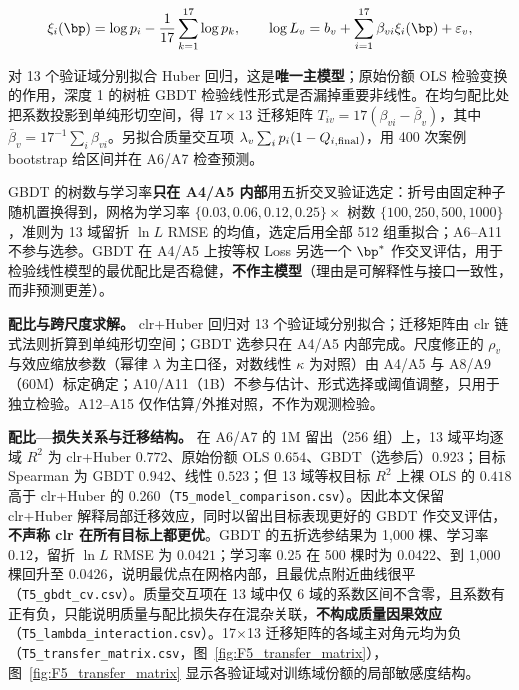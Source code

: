 \begin{equation*}
\xi_i(\bp)=\log p_i-\frac1{17}\sum_{k=1}^{17}\log p_k,\qquad
\log L_v=b_v+\sum_{i=1}^{17}\beta_{vi}\xi_i(\bp)+\varepsilon_v,
\end{equation*}

对 13 个验证域分别拟合 Huber 回归\cite{aitchison,regmix}，这是\textbf{唯一主模型}；原始份额 OLS 检验变换的作用，深度 1 的树桩 GBDT 检验线性形式是否漏掉重要非线性。在均匀配比处把系数投影到单纯形切空间，得 $17\times13$ 迁移矩阵 $T_{iv}=17(\beta_{vi}-\bar\beta_v)$，其中 $\bar\beta_v=17^{-1}\sum_i\beta_{vi}$。另拟合质量交互项 $\lambda_v\sum_ip_i(1-Q_{i,\rm final})$，用 400 次案例 bootstrap 给区间并在 A6/A7 检查预测。

GBDT 的树数与学习率\textbf{只在 A4/A5 内部}用五折交叉验证选定：折号由固定种子随机置换得到，网格为学习率 $\{0.03,0.06,0.12,0.25\}\times$ 树数 $\{100,250,500,1000\}$，准则为 13 域留折 $\ln L$ RMSE 的均值，选定后用全部 512 组重拟合；A6–A11 不参与选参。GBDT 在 A4/A5 上按等权 Loss 另选一个 $\bp^*$ 作交叉评估，用于检验线性模型的最优配比是否稳健，\textbf{不作主模型}（理由是可解释性与接口一致性，而非预测更差）。

\textbf{配比与跨尺度求解。} clr+Huber 回归对 13 个验证域分别拟合；迁移矩阵由 clr 链式法则折算到单纯形切空间；GBDT 选参只在 A4/A5 内部完成。尺度修正的 $\rho_v$ 与效应缩放参数（幂律 $\lambda$ 为主口径，对数线性 $\kappa$ 为对照）由 A4/A5 与 A8/A9（60M）标定确定；A10/A11（1B）不参与估计、形式选择或阈值调整，只用于独立检验。A12--A15 仅作估算/外推对照，不作为观测检验。

\textbf{配比—损失关系与迁移结构。} 在 A6/A7 的 1M 留出（256 组）上，13 域平均逐域 $R^2$ 为 clr+Huber $0.772$、原始份额 OLS $0.654$、GBDT（选参后）$0.923$；目标 Spearman 为 GBDT $0.942$、线性 $0.523$；但 13 域等权目标 $R^2$ 上裸 OLS 的 $0.418$ 高于 clr+Huber 的 $0.260$（\texttt{T5\_model\_comparison.csv}）。因此本文保留 clr+Huber 解释局部迁移效应，同时以留出目标表现更好的 GBDT 作交叉评估，\textbf{不声称 clr 在所有目标上都更优}。GBDT 的五折选参结果为 1,000 棵、学习率 $0.12$，留折 $\ln L$ RMSE 为 $0.0421$；学习率 $0.25$ 在 500 棵时为 $0.0422$、到 1,000 棵回升至 $0.0426$，说明最优点在网格内部，且最优点附近曲线很平（\texttt{T5\_gbdt\_cv.csv}）。质量交互项在 13 域中仅 6 域的系数区间不含零，且系数有正有负，只能说明质量与配比损失存在混杂关联，\textbf{不构成质量因果效应}（\texttt{T5\_lambda\_interaction.csv}）。17$\times$13 迁移矩阵的各域主对角元均为负（\texttt{T5\_transfer\_matrix.csv}，图~\ref{fig:F5_transfer_matrix}），图~\ref{fig:F5_transfer_matrix} 显示各验证域对训练域份额的局部敏感度结构。

